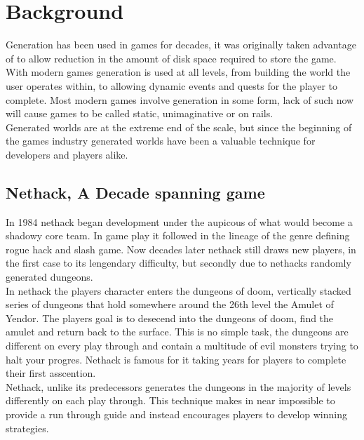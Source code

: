 \section{Background}

Generation has been used in games for decades, it was originally taken advantage
of to allow reduction in the amount of disk space required to store the game.
With modern games generation is used at all levels, from building the world the
user operates within, to allowing dynamic events and quests for the player to
complete. Most modern games involve generation in some form, lack of such now 
will cause games to be called static, unimaginative or on rails.\\

Generated worlds are at the extreme end of the scale, but since the beginning of
the games industry generated worlds have been a valuable technique for developers
and players alike.\\

\subsection*{Nethack, A Decade spanning game}
In 1984 nethack began development under the aupicous of what would become a 
shadowy core team. In game play it followed in the lineage of the genre defining
rogue hack and slash game. Now decades later nethack still draws new players,
in the first case to its lengendary difficulty, but secondly due to nethacks 
randomly generated dungeons.\\ 

In nethack the players character enters the dungeons of doom, vertically stacked
series of dungeons that hold somewhere around the 26th level the Amulet of 
Yendor. The players goal is to desecend into the dungeons of doom, find the
amulet and return back to the surface. This is no simple task, the dungeons are 
different on every play through and contain a multitude of evil monsters trying
to halt your progres. Nethack is famous for it taking years for players to 
complete their first asscention.\\

Nethack, unlike its predecessors generates the dungeons in the majority of levels
differently on each play through. This technique makes in near impossible to 
provide a run through guide and instead encourages players to develop winning
strategies.\\


